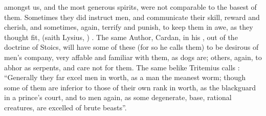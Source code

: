 amongst us, and the most generous spirits, were not comparable to the basest of
them. Sometimes they did instruct men, and communicate their skill, reward and
cherish, and sometimes, again, terrify and punish, to keep them in awe, as they
thought fit,  (saith Lysius,
) . The same Author, Cardan, in his
, out of the doctrine of Stoics, will have some
of these  (for so he calls them) to be desirous
of men's company, very affable and familiar with them, as dogs are; others,
again, to abhor as serpents, and care not for them. The same belike Tritemius
calls : \enquote{Generally they far
excel men in worth, as a man the meanest worm; though some of them are inferior
to those of their own rank in worth, as the blackguard in a prince's court, and
to men again, as some degenerate, base, rational creatures, are excelled of
brute beasts}.

